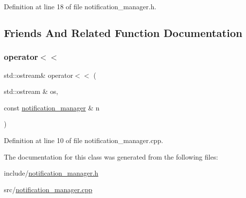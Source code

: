 Definition at line 18 of file notification\+\_\+manager.\+h.



\subsection{Friends And Related Function Documentation}
\mbox{\label{classbattle__ship_1_1notification__manager_ae88cf18d6c7447486803aa949db9b667}} 
\subsubsection{\texorpdfstring{operator$<$$<$}{operator<<}}
{\footnotesize\ttfamily std\+::ostream\& operator$<$$<$ (\begin{DoxyParamCaption}\item[{std\+::ostream \&}]{os,  }\item[{const \hyperlink{classbattle__ship_1_1notification__manager}{notification\+\_\+manager} \&}]{n }\end{DoxyParamCaption})\hspace{0.3cm}{\ttfamily [friend]}}



Definition at line 10 of file notification\+\_\+manager.\+cpp.



The documentation for this class was generated from the following files\+:\begin{DoxyCompactItemize}
\item 
include/\hyperlink{notification__manager_8h}{notification\+\_\+manager.\+h}\item 
src/\hyperlink{notification__manager_8cpp}{notification\+\_\+manager.\+cpp}\end{DoxyCompactItemize}
